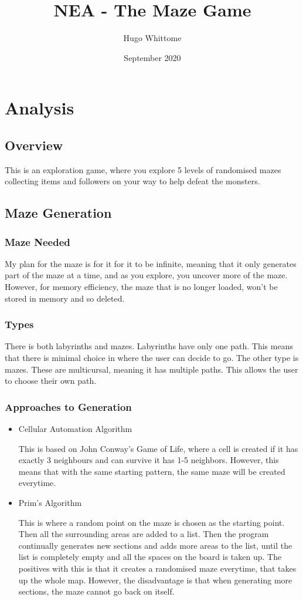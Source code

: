\documentclass{article}
\title{NEA - The Maze Game}
\author{Hugo Whittome}
\date{September 2020}
\begin{document}
    \maketitle
    \tableofcontents
    \clearpage
    \section{Analysis}
        \subsection{Overview}
            This is an exploration game, where you explore 5 levels of randomised mazes collecting items and followers on your way to help defeat the monsters.
        \subsection{Maze Generation}
            \subsubsection{Maze Needed}
                My plan for the maze is for it for it to be infinite, meaning that it only generates part of the maze at a time, and as you explore, you uncover more of the maze. However, for memory efficiency, the maze that is no longer loaded, won't be stored in memory and so deleted.
            \subsubsection{Types}
                There is both labyrinths and mazes. Labyrinths have only one path. This means that there is minimal choice in where the user can decide to go.
                The other type is mazes. These are multicursal, meaning it has multiple paths. This allows the user to choose their own path.
            \subsubsection{Approaches to Generation}
                \begin{itemize}
                    \item Cellular Automation Algorithm

                    This is based on John Conway's Game of Life, where a cell is created if it has exactly 3 neighbours and can survive it has 1-5 neighbors. However, this means that with the same starting pattern, the same maze will be created everytime.

                    \item Prim's Algorithm

                    This is where a random point on the maze is chosen as the starting point. Then all the surrounding areas are added to a list. Then the program continually generates new sections and adds more areas to the list, until the list is completely empty and all the spaces on the board is taken up. The positives with this is that it creates a randomised maze everytime, that takes up the whole map. However, the disadvantage is that when generating more sections, the maze cannot go back on itself.
                \end{itemize}
\end{document}
